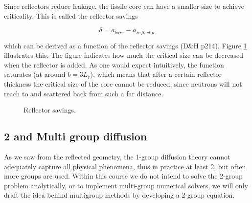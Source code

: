 Since reflectors reduce leakage, the fissile core can have a smaller size to achieve criticality. This is called the reflector savings

\begin{equation}
\delta = a_{bare}-a_{reflector}
\end{equation}

\noindent which can be derived as a function of the reflector savings (D\&H p214). Figure \ref{fig:reflectorsavings} illustrates this. The figure indicates how much the critical size can be decreased when the reflector is added. As one would expect intuitively, the function saturates (at around $b=3L_r$), which means that after a certain reflector thickness the critical size of the core cannot be reduced, since neutrons will not reach to and scattered back from such a far distance.

\begin{figure}[ht!]
\protect {}\protect
\caption{\label{fig:reflectorsavings} \footnotesize{Reflector savings.}}
\end{figure} 

\subsection{2 and Multi group diffusion}

As we saw from the reflected geometry, the 1-group diffusion theory cannot adequately capture all physical phenomena, thus in practice at least 2, but often more groups are used. Within this course we do not intend to solve the 2-group problem analytically, or to implement multi-group numerical solvers, we will only draft the idea behind multigroup methods by developing a 2-group equation.

